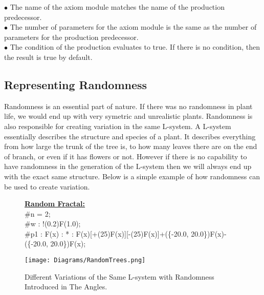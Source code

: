 \begin{flushleft}
\vspace{5mm}

$\bullet$ The name of the axiom module matches the name of the production predecessor. \\
$\bullet$ The number of parameters for the axiom module is the same as the number of parameters for the production predecessor. \\
$\bullet$ The condition of the production evaluates to true. If there is no condition, then the result is true by default.\\

\end{flushleft}

\subsection{Representing Randomness}

\begin{flushleft}

Randomness is an essential part of nature. If there was no randomness in plant life, we would end up with very symetric and unrealistic plants. Randomness is also responsible for creating variation in the same L-system. A L-system essentially describes the structure and species of a plant. It describes everything from how large the trunk of the tree is, to how many leaves there are on the end of branch, or even if it has flowers or not. However if there is no capability to have randomness in the generation of the L-system then we will always end up with the exact same structure. 
\vspace{5mm}
Below is a simple example of how randomness can be used to create variation.

\end{flushleft}   

\begin{figure}[htbp]
	\raggedright
	\textbf{\underline{Random Fractal:}} \\
	\#n = 2; \\
	\#w : !(0.2)F(1.0); \\
	\#p1 : F(x) : * : F(x)[+(25)F(x)][-(25)F(x)]+(\{-20.0, 20.0\})F(x)-(\{-20.0, 20.0\})F(x);\\
	\vspace{10mm}
	{\centering
		\vspace{7px}
		\texttt{[image: Diagrams/RandomTrees.png]}
		\caption{Different Variations of the Same L-system with Randomness Introduced in The Angles. \label{figRandomness}}
	}
\end{figure}
\FloatBarrier

